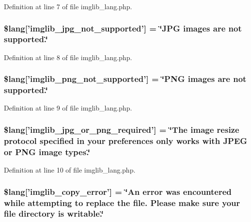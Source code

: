 Definition at line 7 of file imglib\-\_\-lang.\-php.

\subsubsection[{\$lang}]{\setlength{\rightskip}{0pt plus 5cm}\$lang['imglib\-\_\-jpg\-\_\-not\-\_\-supported'] = \char`\"{}J\-P\-G images are {\bf not} supported.\char`\"{}}\label{imglib__lang_8php_a4acdc927c172bab1370b2897c667c552}


Definition at line 8 of file imglib\-\_\-lang.\-php.

\subsubsection[{\$lang}]{\setlength{\rightskip}{0pt plus 5cm}\$lang['imglib\-\_\-png\-\_\-not\-\_\-supported'] = \char`\"{}P\-N\-G images are {\bf not} supported.\char`\"{}}\label{imglib__lang_8php_a0b7ea2e2fbd03eb72fe9d969adb643dd}


Definition at line 9 of file imglib\-\_\-lang.\-php.

\subsubsection[{\$lang}]{\setlength{\rightskip}{0pt plus 5cm}\$lang['imglib\-\_\-jpg\-\_\-or\-\_\-png\-\_\-required'] = \char`\"{}The image resize protocol specified in your preferences only works with J\-P\-E\-G {\bf or} P\-N\-G image types.\char`\"{}}\label{imglib__lang_8php_a2878e2b878871cd8010970f865d70e71}


Definition at line 10 of file imglib\-\_\-lang.\-php.

\subsubsection[{\$lang}]{\setlength{\rightskip}{0pt plus 5cm}\$lang['imglib\-\_\-copy\-\_\-error'] = \char`\"{}An error was encountered while attempting {\bf to} replace the file. Please make sure your file directory is writable.\char`\"{}}\label{imglib__lang_8php_a012b6a0d2b3a8ef934e8783d2fbd6535}


